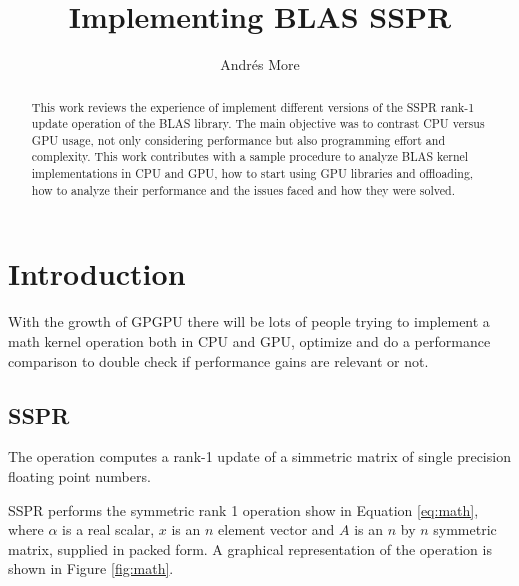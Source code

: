 \documentclass{llncs}
\begin{document}


\title{Implementing BLAS SSPR}
\author{Andrés More }


\maketitle

\begin{abstract}

This work reviews the experience of implement different versions of the SSPR rank-1 update operation
of the BLAS library. The main objective was to contrast CPU versus GPU usage,
not only considering performance but also programming effort and complexity.
This work contributes with a sample procedure to analyze BLAS kernel implementations in CPU and GPU,
how to start using GPU libraries and offloading, how to analyze their performance and
the issues faced and how they were solved.

\end{abstract}

\section{Introduction}

With the growth of GPGPU there will be lots of people trying to implement a math kernel operation both in CPU
and GPU, optimize and do a performance comparison to double check if performance gains are relevant or not.

\subsection{SSPR}

The operation computes a rank-1 update of a simmetric matrix of single precision floating point numbers.

SSPR performs the symmetric rank 1 operation show in Equation \ref{eq:math},
where $ \alpha $ is a real scalar, $ x $ is an $ n $ element vector and $ A $ is an
$ n $ by $ n $ symmetric matrix, supplied in packed form.
A graphical representation of the operation is shown in Figure \ref{fig:math}.
\end{document}
